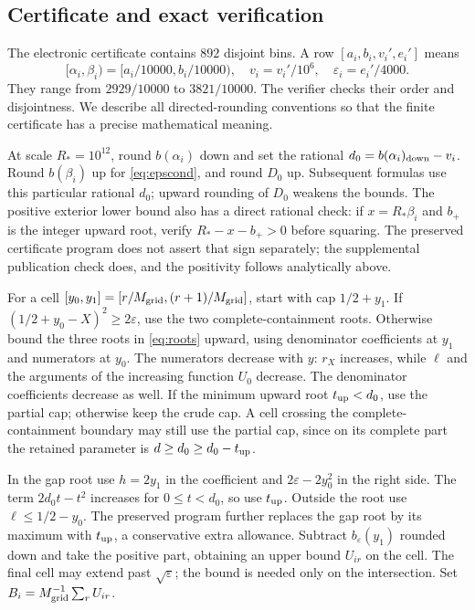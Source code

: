 \documentclass[10pt]{amsart}
\theoremstyle{remark}
\begin{document}
\subsection{Certificate and exact verification}\label{sec:certificate}
The electronic certificate contains $892$ disjoint bins. A row
$[a_i,b_i,v_i',e_i']$ means
\[
 [\alpha_i,\beta_i)=[a_i/10000,b_i/10000),\quad
 v_i=v_i'/10^6,\quad\varepsilon_i=e_i'/4000.
\]
They range from $2929/10000$ to $3821/10000$. The verifier checks their
order and disjointness. We describe all directed-rounding conventions
so that the finite certificate has a precise mathematical meaning.

At scale $R_*=10^{12}$, round $b(\alpha_i)$ down and set the rational
$d_0=b(\alpha_i)_{\rm down}-v_i$. Round $b(\beta_i)$ up for
\eqref{eq:epscond}, and round $D_0$ up. Subsequent formulas use this
particular rational $d_0$; upward rounding of $D_0$ weakens the bounds.
The positive exterior lower bound also has a direct rational check:
if $x=R_*\beta_i$ and $b_+$ is the integer upward root, verify
$R_*-x-b_+>0$ before squaring. The preserved certificate program
does not assert that sign separately; the supplemental publication
check does, and the positivity follows analytically above.

For a cell $[y_0,y_1]=[r/M_{\rm grid},(r+1)/M_{\rm grid}]$, start
with cap $1/2+y_1$. If $(1/2+y_0-X)^2\ge2\varepsilon$, use the two
complete-containment roots. Otherwise bound the three roots in
\eqref{eq:roots} upward, using denominator coefficients at $y_1$ and
numerators at $y_0$. The numerators decrease with $y$: $r_X$ increases,
while $\ell$ and the arguments of the increasing function $U_0$ decrease.
The denominator coefficients decrease as well. If the minimum upward
root $t_{\rm up}<d_0$, use the partial cap; otherwise keep the crude
cap. A cell crossing the complete-containment boundary may still use
the partial cap, since on its complete part the retained parameter is
$d\ge d_0\ge d_0-t_{\rm up}$.

In the gap root use $h=2y_1$ in the coefficient and
$2\varepsilon-2y_0^2$ in the right side. The term
$2d_0t-t^2$ increases for $0\le t<d_0$, so use $t_{\rm up}$.
Outside the root use $\ell\le1/2-y_0$. The preserved program further
replaces the gap root by its maximum with $t_{\rm up}$, a conservative
extra allowance. Subtract $b_\varepsilon(y_1)$ rounded down and take
the positive part, obtaining an upper bound $U_{ir}$ on the cell.
The final cell may extend past $\sqrt\varepsilon$; the bound is needed
only on the intersection. Set $B_i=M_{\rm grid}^{-1}\sum_r U_{ir}$.
\end{document}
